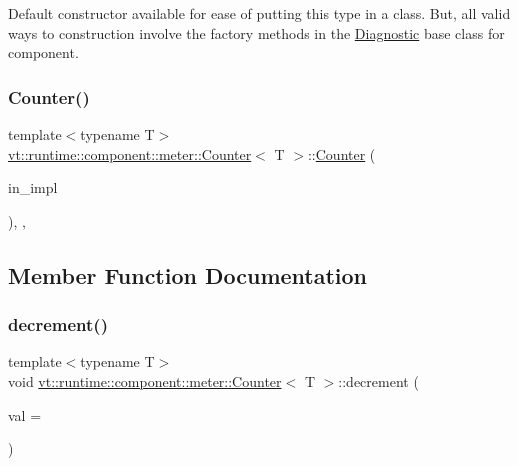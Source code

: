 Default constructor available for ease of putting this type in a class. But, all valid ways to construction involve the factory methods in the {\ttfamily \hyperlink{structvt_1_1runtime_1_1component_1_1_diagnostic}{Diagnostic}} base class for component. 

\mbox{\label{structvt_1_1runtime_1_1component_1_1meter_1_1_counter_a649a29b69ce8db44fa9643820cd75080}} 
\subsubsection{\texorpdfstring{Counter()}{Counter()}\hspace{0.1cm}{\footnotesize\ttfamily [2/2]}}
{\footnotesize\ttfamily template$<$typename T$>$ \\
\hyperlink{structvt_1_1runtime_1_1component_1_1meter_1_1_counter}{vt\+::runtime\+::component\+::meter\+::\+Counter}$<$ T $>$\+::\hyperlink{structvt_1_1runtime_1_1component_1_1meter_1_1_counter}{Counter} (\begin{DoxyParamCaption}\item[{\hyperlink{structvt_1_1runtime_1_1component_1_1detail_1_1_diagnostic_value}{detail\+::\+Diagnostic\+Value}$<$ T $>$ $\ast$}]{in\+\_\+impl }\end{DoxyParamCaption})\hspace{0.3cm}{\ttfamily [inline]}, {\ttfamily [explicit]}, {\ttfamily [private]}}



\subsection{Member Function Documentation}
\mbox{\label{structvt_1_1runtime_1_1component_1_1meter_1_1_counter_a020d52d2540855c661003bb50265e7db}} 
\subsubsection{\texorpdfstring{decrement()}{decrement()}}
{\footnotesize\ttfamily template$<$typename T$>$ \\
void \hyperlink{structvt_1_1runtime_1_1component_1_1meter_1_1_counter}{vt\+::runtime\+::component\+::meter\+::\+Counter}$<$ T $>$\+::decrement (\begin{DoxyParamCaption}\item[{T}]{val = {} }\end{DoxyParamCaption})\hspace{0.3cm}{\ttfamily [inline]}}



